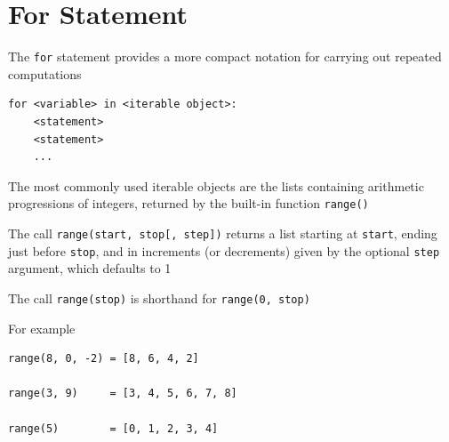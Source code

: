\documentclass[8pt,a4paper,compress]{beamer}
\begin{document}
\section{For Statement}
\begin{frame}[fragile]
\pause

The \lstinline{for} statement provides a more compact notation for carrying out repeated computations

\pause\bigskip

\begin{lstlisting}[language={},style=focusin]
for <variable> in <iterable object>:
    <statement>
    <statement>
    ...
\end{lstlisting}

\pause\bigskip

The most commonly used iterable objects are the lists containing arithmetic progressions of integers, returned by the built-in function \lstinline{range()}

\pause\bigskip

The call \lstinline{range(start, stop[, step])} returns a list starting at \lstinline{start}, ending just before \lstinline{stop}, and in increments (or decrements) given by the optional \lstinline{step} argument, which defaults to 1

\pause\bigskip

The call \lstinline{range(stop)} is shorthand for \lstinline{range(0, stop)}

\pause\bigskip

For example

\smallskip

\begin{lstlisting}[language={},style=focusin]
range(8, 0, -2) = [8, 6, 4, 2]

range(3, 9)     = [3, 4, 5, 6, 7, 8]

range(5)        = [0, 1, 2, 3, 4]
\end{lstlisting}
\end{frame}
\end{document}

